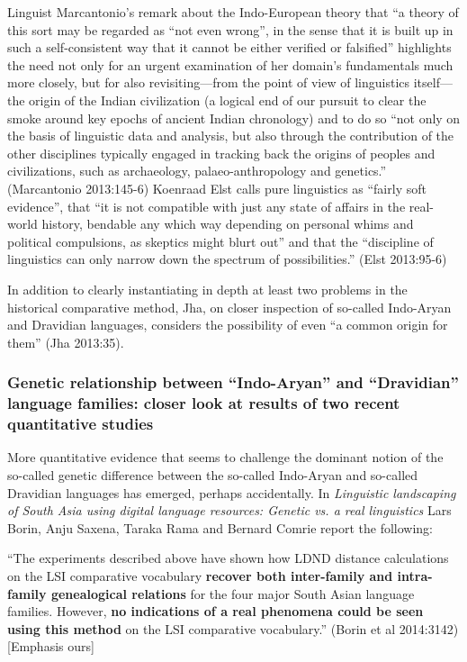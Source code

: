\vskip 4pt

Linguist Marcantonio’s remark about the Indo-European theory that “a theory of this sort may be regarded as “not even wrong”, in the sense that it is built up in such a self-consistent way that it cannot be either verified or falsified” highlights the need not only for an urgent examination of her domain’s fundamentals much more closely, but for also revisiting—from the point of view of linguistics itself—the origin of the Indian civilization (a logical end of our pursuit to clear the smoke around key epochs of ancient Indian chronology) and to do so “not only on the basis of linguistic data and analysis, but also through the contribution of the other disciplines typically engaged in tracking back the origins of peoples and civilizations, such as archaeology, palaeo-anthropology and genetics.” (Marcantonio 2013:145-6) Koenraad Elst calls pure linguistics as “fairly soft evidence”, that “it is not compatible with just any state of affairs in the real-world history, bendable any which way depending on personal whims and political compulsions, as skeptics might blurt out” and that the “discipline of linguistics can only narrow down the spectrum of possibilities.” (Elst 2013:95-6)

In addition to clearly instantiating in depth at least two problems in the historical comparative method, Jha, on closer inspection of so-called Indo-Aryan and Dravidian languages, considers the possibility of even “a common origin for them” (Jha 2013:35).


\subsubsection{Genetic relationship between “Indo-Aryan” and “Dravidian” language families: closer look at results of two recent quantitative studies}

More quantitative evidence that seems to challenge the dominant notion of the so-called genetic difference between the so-called Indo-Aryan and so-called Dravidian languages has emerged, perhaps accidentally. In \textit{Linguistic landscaping of South Asia using digital language resources: Genetic vs. a real linguistics} Lars Borin, Anju Saxena, Taraka Rama and Bernard Comrie report the following:

\begin{myquote}
“The experiments described above have shown how LDND distance calculations on the LSI comparative vocabulary \textbf{recover both inter-family and intra-family genealogical relations} for the four major South Asian language families. However,\textbf{ no indications of a real phenomena could be seen using this method} on the LSI comparative vocabulary.” \hfill (Borin et al 2014:3142)[Emphasis ours]
\end{myquote}

